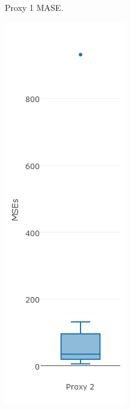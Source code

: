 \begin{figure}[!h]
{\begin{subfigure}{.25\linewidth}
  \caption{Proxy 1 MASE.}
  \label{fig:bp2}
\end{subfigure}
\begin{subfigure}{.25\linewidth}
  \centering
  \includegraphics[width=\linewidth]{img/6mmaMsebp.png}

\end{subfigure}}
\end{figure}
